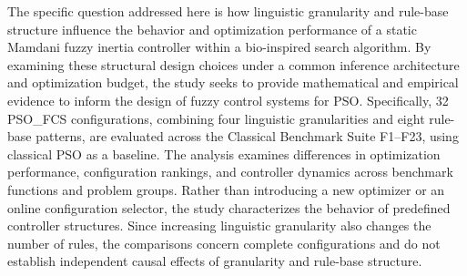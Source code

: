 

The specific question addressed here is how linguistic granularity and rule-base structure influence the behavior and optimization performance of a static Mamdani fuzzy inertia controller within a bio-inspired search algorithm. By examining these structural design choices under a common inference architecture and optimization budget, the study seeks to provide mathematical and empirical evidence to inform the design of fuzzy control systems for PSO. Specifically, 32 PSO\_FCS configurations, combining four linguistic granularities and eight rule-base patterns, are evaluated across the Classical Benchmark Suite F1--F23, using classical PSO as a baseline. The analysis examines differences in optimization performance, configuration rankings, and controller dynamics across benchmark functions and problem groups. Rather than introducing a new optimizer or an online configuration selector, the study characterizes the behavior of predefined controller structures. Since increasing linguistic granularity also changes the number of rules, the comparisons concern complete configurations and do not establish independent causal effects of granularity and rule-base structure.




